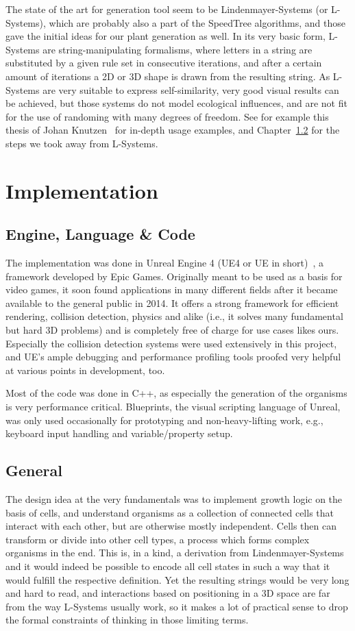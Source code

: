 \documentclass[11pt, abstract=on]{scrartcl}
\begin{document}
The state of the art for generation tool seem to be Lindenmayer-Systems (or L-Systems), which are probably also a part of the SpeedTree algorithms, and those gave the initial ideas for our plant generation as well. In its very basic form, L-Systems are string-manipulating formalisms, where letters in a string are substituted by a given rule set in consecutive iterations, and after a certain amount of iterations a 2D or 3D shape is drawn from the resulting string. As L-Systems are very suitable to express self-similarity, very good visual results can be achieved, but those systems do not model ecological influences, and are not fit for the use of randoming with many degrees of freedom. See for example this thesis of Johan Knutzen~\cite{ClimbingPlants} for in-depth usage examples, and Chapter~\ref{cpt:ImplGeneral} for the steps we took away from L-Systems.

\section{Implementation}
\subsection{Engine, Language \& Code}
The implementation was done in Unreal Engine 4 (UE4 or UE in short)~\cite{WhatIsUnreal}, a framework developed by Epic Games. Originally meant to be used as a basis for video games, it soon found applications in many different fields after it became available to the general public in 2014. It offers a strong framework for efficient rendering, collision detection, physics and alike (i.e., it solves many fundamental but hard 3D problems) and is completely free of charge for use cases likes ours. Especially the collision detection systems were used extensively in this project, and UE's ample debugging and performance profiling tools proofed very helpful at various points in development, too. 

Most of the code was done in C++, as especially the generation of the organisms is very performance critical. Blueprints, the visual scripting language of Unreal, was only used occasionally for prototyping and non-heavy-lifting work, e.g., keyboard input handling and variable/property setup.

\subsection{General} \label{cpt:ImplGeneral}
The design idea at the very fundamentals was to implement growth logic on the basis of cells, and understand organisms as a collection of connected cells that interact with each other, but are otherwise mostly independent. Cells then can transform or divide into other cell types, a process which forms complex organisms in the end. This is, in a kind, a derivation from Lindenmayer-Systems and it would indeed be possible to encode all cell states in such a way that it would fulfill the respective definition. Yet the resulting strings would be very long and hard to read, and interactions based on positioning in a 3D space are far from the way L-Systems usually work, so it makes a lot of practical sense to drop the formal constraints of thinking in those limiting terms. 
\end{document}
